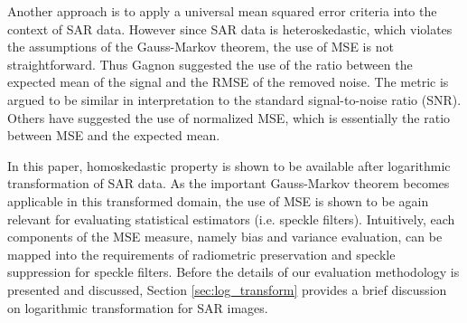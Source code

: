 \documentclass[journal]{IEEEtran}
\begin{document}

Another approach is to apply a universal mean squared error criteria into the context of SAR data. 
However since SAR data is heteroskedastic, which violates the assumptions of the Gauss-Markov theorem, 
	the use of MSE is not straightforward. 
Thus Gagnon \cite{Gagnon_SPIEProc_1997} suggested the use of
  the ratio between the expected mean of the signal and the RMSE of the removed noise. 
The metric is argued to be similar in interpretation to the standard signal-to-noise ratio (SNR). 
Others have suggested the use of normalized MSE, which is essentially the ratio between MSE and the expected mean.


In this paper, homoskedastic property is shown to be available after logarithmic transformation of SAR data.
As the important Gauss-Markov theorem becomes applicable in this transformed domain, 
	the use of MSE is shown to be again relevant for evaluating statistical estimators (i.e. speckle filters).
Intuitively, each components of the MSE measure, 
	namely bias and variance evaluation, can be mapped into 
	the requirements of radiometric preservation and speckle suppression for speckle filters.
Before the details of our evaluation methodology is presented and discussed, 
	Section \ref{sec:log_transform} provides a brief discussion on logarithmic transformation for SAR images.
\end{document}
